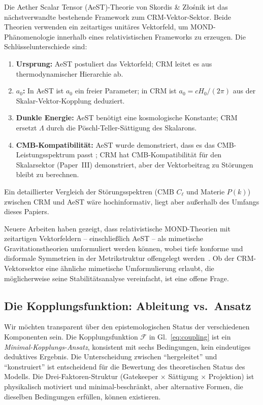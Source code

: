 \documentclass[aps,prd,twocolumn,superscriptaddress,nofootinbib]{revtex4-2}
\begin{document}
Die Aether Scalar Tensor (AeST)-Theorie von Skordis \& Z{\l}o\'snik \cite{Skordis2021} ist das n\"achstverwandte bestehende Framework zum CRM-Vektor-Sektor. Beide Theorien verwenden ein zeitartiges unit\"ares Vektorfeld, um MOND-Ph\"anomenologie innerhalb eines relativistischen Frameworks zu erzeugen. Die Schl\"usselunterschiede sind:

\begin{enumerate}
\item \textbf{Ursprung:} AeST postuliert das Vektorfeld; CRM leitet es aus thermodynamischer Hierarchie ab.
\item \textbf{$a_0$:} In AeST ist $a_0$ ein freier Parameter; in CRM ist $a_0 = cH_0/(2\pi)$ aus der Skalar-Vektor-Kopplung deduziert.
\item \textbf{Dunkle Energie:} AeST ben\"otigt eine kosmologische Konstante; CRM ersetzt $\Lambda$ durch die P\"oschl-Teller-S\"attigung des Skalarons.
\item \textbf{CMB-Kompatibilit\"at:} AeST wurde demonstriert, dass es das CMB-Leistungsspektrum passt \cite{Skordis2021}; CRM hat CMB-Kompatibilit\"at f\"ur den Skalarsektor (Paper~III) demonstriert, aber der Vektorbeitrag zu St\"orungen bleibt zu berechnen.
\end{enumerate}

Ein detaillierter Vergleich der St\"orungsspektren (CMB $C_\ell$ und Materie $P(k)$) zwischen CRM und AeST w\"are hochinformativ, liegt aber au\ss{}erhalb des Umfangs dieses Papiers.

Neuere Arbeiten haben gezeigt, dass relativistische MOND-Theorien mit zeitartigen Vektorfeldern -- einschlie\ss{}lich AeST -- als mimetische Gravitationstheorien umformuliert werden k\"onnen, wobei tiefe konforme und disformale Symmetrien in der Metrikstruktur offengelegt werden~\cite{MimeticMOND2024}. Ob der CRM-Vektorsektor eine \"ahnliche mimetische Umformulierung erlaubt, die m\"oglicherweise seine Stabilit\"atsanalyse vereinfacht, ist eine offene Frage.

\subsection{Die Kopplungsfunktion: Ableitung vs.\ Ansatz}

Wir m\"ochten transparent \"uber den epistemologischen Status der verschiedenen Komponenten sein. Die Kopplungsfunktion $\mathcal{F}$ in Gl.~\eqref{eq:coupling} ist ein \textit{Minimal-Kopplungs-Ansatz}, konsistent mit sechs Bedingungen, kein eindeutiges deduktives Ergebnis. Die Unterscheidung zwischen ``hergeleitet'' und ``konstruiert'' ist entscheidend f\"ur die Bewertung des theoretischen Status des Modells. Die Drei-Faktoren-Struktur (Gatekeeper $\times$ S\"attigung $\times$ Projektion) ist physikalisch motiviert und minimal-beschr\"ankt, aber alternative Formen, die dieselben Bedingungen erf\"ullen, k\"onnen existieren.
\end{document}
